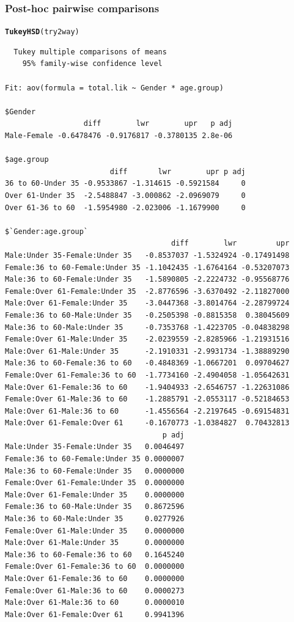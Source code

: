 \documentclass{beamer}\usepackage[]{graphicx}\usepackage[]{color}
\makeatletter
\newcommand{\hlstd}[1]{\textcolor[rgb]{0.345,0.345,0.345}{#1}}%
\newcommand{\hlkwd}[1]{\textcolor[rgb]{0.737,0.353,0.396}{\textbf{#1}}}%
\newenvironment{kframe}{%
 \def\at@end@of@kframe{}%
 \ifinner\ifhmode%
  \def\at@end@of@kframe{\end{minipage}}%
  \begin{minipage}{\columnwidth}%
 \fi\fi%
 \def\FrameCommand##1{\hskip\@totalleftmargin \hskip-\fboxsep
 \colorbox{shadecolor}{##1}\hskip-\fboxsep
     \hskip-\linewidth \hskip-\@totalleftmargin \hskip\columnwidth}%
 \MakeFramed {\advance\hsize-\width
   \@totalleftmargin\z@ \linewidth\hsize
   \@setminipage}}%
 {\par\unskip\endMakeFramed%
 \at@end@of@kframe}
\newenvironment{knitrout}{}{} %
\makeatother
\begin{document}
\begin{frame}[fragile]
  \frametitle{Post-hoc pairwise comparisons}
\begin{knitrout}
\color{fgcolor}\begin{kframe}
\begin{alltt}
\hlkwd{TukeyHSD}\hlstd{(try2way)}
\end{alltt}
\begin{verbatim}
  Tukey multiple comparisons of means
    95% family-wise confidence level

Fit: aov(formula = total.lik ~ Gender * age.group)

$Gender
                  diff        lwr        upr   p adj
Male-Female -0.6478476 -0.9176817 -0.3780135 2.8e-06

$age.group
                        diff       lwr        upr p adj
36 to 60-Under 35 -0.9533867 -1.314615 -0.5921584     0
Over 61-Under 35  -2.5488847 -3.000862 -2.0969079     0
Over 61-36 to 60  -1.5954980 -2.023006 -1.1679900     0

$`Gender:age.group`
                                      diff        lwr         upr
Male:Under 35-Female:Under 35   -0.8537037 -1.5324924 -0.17491498
Female:36 to 60-Female:Under 35 -1.1042435 -1.6764164 -0.53207073
Male:36 to 60-Female:Under 35   -1.5890805 -2.2224732 -0.95568776
Female:Over 61-Female:Under 35  -2.8776596 -3.6370492 -2.11827000
Male:Over 61-Female:Under 35    -3.0447368 -3.8014764 -2.28799724
Female:36 to 60-Male:Under 35   -0.2505398 -0.8815358  0.38045609
Male:36 to 60-Male:Under 35     -0.7353768 -1.4223705 -0.04838298
Female:Over 61-Male:Under 35    -2.0239559 -2.8285966 -1.21931516
Male:Over 61-Male:Under 35      -2.1910331 -2.9931734 -1.38889290
Male:36 to 60-Female:36 to 60   -0.4848369 -1.0667201  0.09704627
Female:Over 61-Female:36 to 60  -1.7734160 -2.4904058 -1.05642631
Male:Over 61-Female:36 to 60    -1.9404933 -2.6546757 -1.22631086
Female:Over 61-Male:36 to 60    -1.2885791 -2.0553117 -0.52184653
Male:Over 61-Male:36 to 60      -1.4556564 -2.2197645 -0.69154831
Male:Over 61-Female:Over 61     -0.1670773 -1.0384827  0.70432813
                                    p adj
Male:Under 35-Female:Under 35   0.0046497
Female:36 to 60-Female:Under 35 0.0000007
Male:36 to 60-Female:Under 35   0.0000000
Female:Over 61-Female:Under 35  0.0000000
Male:Over 61-Female:Under 35    0.0000000
Female:36 to 60-Male:Under 35   0.8672596
Male:36 to 60-Male:Under 35     0.0277926
Female:Over 61-Male:Under 35    0.0000000
Male:Over 61-Male:Under 35      0.0000000
Male:36 to 60-Female:36 to 60   0.1645240
Female:Over 61-Female:36 to 60  0.0000000
Male:Over 61-Female:36 to 60    0.0000000
Female:Over 61-Male:36 to 60    0.0000273
Male:Over 61-Male:36 to 60      0.0000010
Male:Over 61-Female:Over 61     0.9941396
\end{verbatim}
\end{kframe}
\end{knitrout}
\end{frame} 
 
\end{document}
